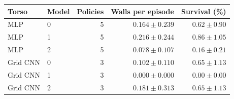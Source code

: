 \begin{tabular}{llrrr}
\toprule
\rowcolor{Navy!8}
Torso & Model & Policies & Walls per episode & Survival (\%) \\
\midrule
MLP & 0 & 5 & $0.164\pm0.239$ & $0.62\pm0.90$ \\
MLP & 1 & 5 & $0.216\pm0.244$ & $0.86\pm1.05$ \\
MLP & 2 & 5 & $0.078\pm0.107$ & $0.16\pm0.21$ \\
\midrule
Grid CNN & 0 & 3 & $0.102\pm0.110$ & $0.65\pm1.13$ \\
Grid CNN & 1 & 3 & $0.000\pm0.000$ & $0.00\pm0.00$ \\
Grid CNN & 2 & 3 & $0.181\pm0.313$ & $0.65\pm1.13$ \\
\bottomrule
\end{tabular}
